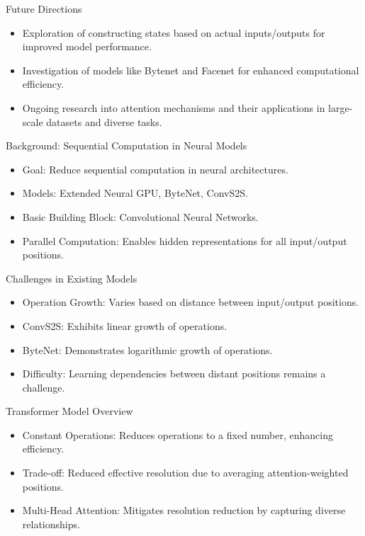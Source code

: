 \documentclass{beamer}
\begin{document}
\begin{frame}{Future Directions}
\begin{itemize}
\item Exploration of constructing states based on actual inputs/outputs for improved model performance.
\item Investigation of models like Bytenet and Facenet for enhanced computational efficiency.
\item Ongoing research into attention mechanisms and their applications in large-scale datasets and diverse tasks.
\end{itemize}
\end{frame}

\begin{frame}{Background: Sequential Computation in Neural Models}
\begin{itemize}
\item Goal: Reduce sequential computation in neural architectures.
\item Models: Extended Neural GPU, ByteNet, ConvS2S.
\item Basic Building Block: Convolutional Neural Networks.
\item Parallel Computation: Enables hidden representations for all input/output positions.
\end{itemize}
\end{frame}

\begin{frame}{Challenges in Existing Models}
\begin{itemize}
\item Operation Growth: Varies based on distance between input/output positions.
\item ConvS2S: Exhibits linear growth of operations.
\item ByteNet: Demonstrates logarithmic growth of operations.
\item Difficulty: Learning dependencies between distant positions remains a challenge.
\end{itemize}
\end{frame}

\begin{frame}{Transformer Model Overview}
\begin{itemize}
\item Constant Operations: Reduces operations to a fixed number, enhancing efficiency.
\item Trade-off: Reduced effective resolution due to averaging attention-weighted positions.
\item Multi-Head Attention: Mitigates resolution reduction by capturing diverse relationships.
\end{itemize}
\end{frame}
\end{document}
